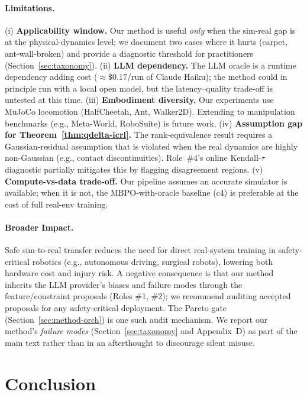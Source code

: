 \documentclass{article}
\theoremstyle{definition}
\begin{document}
\paragraph{Limitations.}
(i) \textbf{Applicability window.}  Our method is useful \emph{only}
when the sim-real gap is at the physical-dynamics level; we document
two cases where it hurts (carpet, ant-wall-broken) and provide a
diagnostic threshold for practitioners (Section~\ref{sec:taxonomy}).
(ii) \textbf{LLM dependency.}  The LLM oracle is a runtime dependency
adding cost ($\approx\$0.17$/run of Claude Haiku); the method could in
principle run with a local open model, but the latency--quality
trade-off is untested at this time.
(iii) \textbf{Embodiment diversity.}  Our experiments use MuJoCo
locomotion (HalfCheetah, Ant, Walker2D).  Extending to manipulation
benchmarks (e.g., Meta-World, RoboSuite) is future work.
(iv) \textbf{Assumption gap for Theorem~\ref{thm:qdelta-icrl}.}
The rank-equivalence result requires a Gaussian-residual assumption
that is violated when the real dynamics are highly non-Gaussian
(e.g., contact discontinuities).  Role~\#4's online Kendall-$\tau$
diagnostic partially mitigates this by flagging disagreement regions.
(v) \textbf{Compute-vs-data trade-off.}  Our pipeline assumes an
accurate simulator is available; when it is not, the MBPO-with-oracle
baseline (c4) is preferable at the cost of full real-env training.

\paragraph{Broader Impact.}
Safe sim-to-real transfer reduces the need for direct real-system
training in safety-critical robotics (e.g., autonomous driving,
surgical robots), lowering both hardware cost and injury risk.  A
negative consequence is that our method inherits the LLM provider's
biases and failure modes through the feature/constraint proposals
(Roles \#1, \#2); we recommend auditing accepted proposals for any
safety-critical deployment.  The Pareto gate (Section~\ref{sec:method-orch})
is one such audit mechanism.  We report our method's \emph{failure
modes} (Section~\ref{sec:taxonomy} and Appendix~D) as part of the
main text rather than in an afterthought to discourage silent misuse.

\section{Conclusion}
\end{document}
